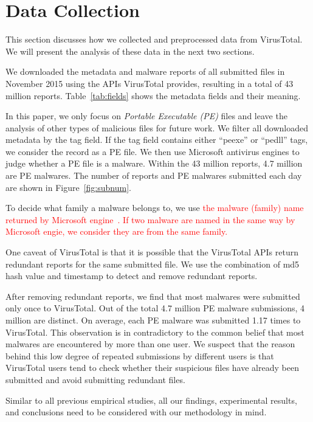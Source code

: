

\section{Data Collection}
\label{sec:meth}

This section discusses how we collected and preprocessed data from VirusTotal.
We will present the analysis of these data in the next two sections.

We downloaded the metadata and malware reports of all submitted files in November 2015 using the APIs VirusTotal provides,
resulting in a total of 43 million reports.
Table~\ref{tab:fields} shows the metadata fields and their meaning. 

In this paper, we only focus on {\em Portable Executable (PE)} files 
and leave the analysis of other types of malicious files for future work. 
We filter all downloaded metadata by the tag field. 
If the tag field contains either ``peexe'' or ``pedll'' tags, we consider the record as a PE file. 
We then use Microsoft antivirus engines to judge whether a PE file is a malware.
Within the 43 million reports, 4.7 million are PE malwares. 
The number of reports and PE malwares submitted each day are shown in Figure~\ref{fig:subnum}.

To decide what family a malware belongs to, we use 
\textcolor{red}{the malware (family) name returned by Microsoft engine~\cite{microsoft}. 
If two malware are named in the same way by Microsoft engie, we consider they are from the same family.} 


One caveat of VirusTotal is that it is possible that the VirusTotal APIs return redundant reports 
for the same submitted file. 
We use the combination of md5 hash value and timestamp to detect and remove redundant reports.

After removing redundant reports, we find that most malwares were submitted only once to VirusTotal. 
Out of the total 4.7 million PE malware submissions, 4 million are distinct. 
On average, each PE malware was submitted 1.17 times to VirusTotal. 
This observation is in contradictory to the common belief that most malwares are encountered by more than one user.
We suspect that the reason behind this low degree of repeated submissions by different users
is that VirusTotal users
tend to check whether their suspicious files have already been submitted
and avoid submitting redundant files.

Similar to all previous empirical studies, all our findings, experimental results, 
and conclusions need to be considered with our methodology in mind. 

